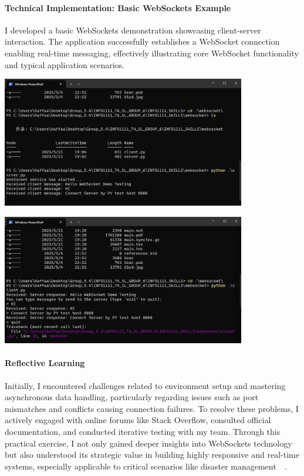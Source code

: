 \documentclass[a4paper, 11pt]{report}
\begin{document}
\paragraph{Technical Implementation: Basic WebSockets Example}

I developed a basic WebSockets demonstration showcasing client-server interaction. The application successfully establishes a WebSocket connection enabling real-time messaging, effectively illustrating core WebSocket functionality and typical application scenarios.

\begin{center}
\includegraphics[width=0.8\textwidth]{kaffa/server.png}
\end{center}

\begin{center}
\includegraphics[width=0.8\textwidth]{kaffa/client.png}
\end{center}

\paragraph{Reflective Learning}

Initially, I encountered challenges related to environment setup and mastering asynchronous data handling, particularly regarding issues such as port mismatches and conflicts causing connection failures. To resolve these problems, I actively engaged with online forums like Stack Overflow, consulted official documentation, and conducted iterative testing with my team. Through this practical exercise, I not only gained deeper insights into WebSockets technology but also understood its strategic value in building highly responsive and real-time systems, especially applicable to critical scenarios like disaster management~\cite{websockets_lib}~\cite{sfia_guide}.
\end{document}
